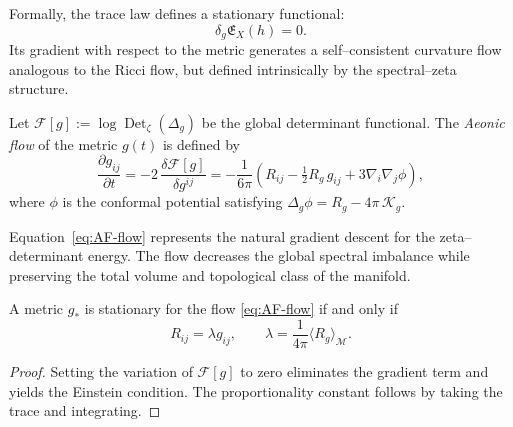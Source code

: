Formally, the trace law defines a stationary functional:
\[
\delta_g \mathfrak{E}_X(h) = 0.
\]
Its gradient with respect to the metric generates 
a self–consistent curvature flow analogous to the Ricci flow,
but defined intrinsically by the spectral–zeta structure.


\begin{definition}
\label{def:AF-flow}
Let \(\mathcal{F}[g] := \log \operatorname{Det}_\zeta(\Delta_g)\)
be the global determinant functional.
The \emph{Aeonic flow} of the metric \(g(t)\)
is defined by
\begin{equation}
\label{eq:AF-flow}
\frac{\partial g_{ij}}{\partial t}
=
-2\,\frac{\delta \mathcal{F}[g]}{\delta g^{ij}}
=
-\frac{1}{6\pi}\left(
R_{ij} - \tfrac{1}{2}R_g\,g_{ij}
+ 3\nabla_i\nabla_j \phi
\right),
\end{equation}
where \(\phi\) is the conformal potential satisfying
\(\Delta_g \phi = R_g - 4\pi\,\mathcal{K}_g\).
\end{definition}

\begin{remark}
Equation~\eqref{eq:AF-flow} represents the natural gradient descent
for the zeta–determinant energy.
The flow decreases the global spectral imbalance while preserving
the total volume and topological class of the manifold.
\end{remark}


\begin{theorem}
\label{thm:AF-stationary}
A metric \(g_*\) is stationary for the flow \eqref{eq:AF-flow}
if and only if
\begin{equation}
\label{eq:AF-stationary}
R_{ij} = \lambda g_{ij},
\qquad
\lambda = \frac{1}{4\pi}\langle R_g \rangle_{\mathcal{M}}.
\end{equation}
\end{theorem}

\begin{proof}
Setting the variation of \(\mathcal{F}[g]\) to zero
eliminates the gradient term and yields the Einstein condition.
The proportionality constant follows by taking the trace and integrating.
\end{proof}

